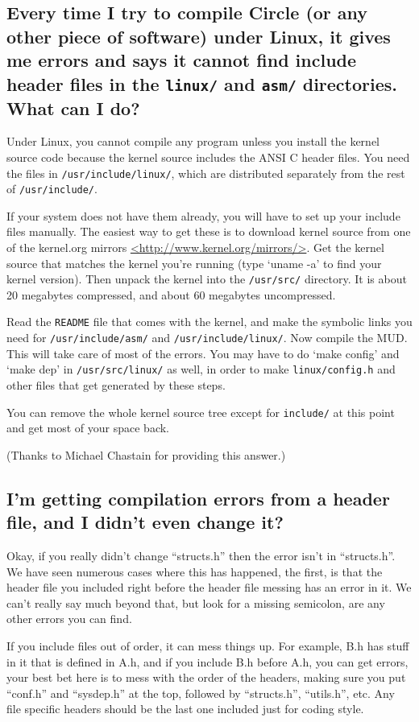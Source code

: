 \documentclass[11pt]{article}
\begin{document}
\subsection{Every time I try to compile Circle (or any other piece of software) under Linux, it gives me errors and says it cannot find include header files in the \texttt{linux/} and \texttt{asm/} directories.  What can I do?}
Under Linux, you cannot compile any program unless you install the kernel source code because the kernel source includes the ANSI C header files.  You need the files in \texttt{/usr/include/linux/}, which are distributed separately from the rest of \texttt{/usr/include/}. 
\par
If your system does not have them already, you will have to set up your include files manually. The easiest way to get these is to download kernel source from one of the kernel.org mirrors
\url{<http://www.kernel.org/mirrors/>}. Get the kernel source that matches the kernel you're running (type `uname -a' to find your kernel version).  Then unpack the kernel into the \texttt{/usr/src/} directory.  It is about 20 megabytes compressed, and about 60 megabytes uncompressed. 
\par
Read the \texttt{README} file that comes with the kernel, and make the symbolic links you need for \texttt{/usr/include/asm/} and \texttt{/usr/include/linux/}. Now compile the MUD.  This will take care of most of the errors.  You may have to do `make config' and `make dep' in \texttt{/usr/src/linux/} as well, in order to make \texttt{linux/config.h} and other files that get generated by these steps. 
\par
You can remove the whole kernel source tree except for \texttt{include/} at this point and get most of your space back. 
\par
(Thanks to Michael Chastain for providing this answer.)

\subsection{I'm getting compilation errors from a header file, and I didn't even change it?}
Okay, if you really didn't change ``structs.h'' then the error isn't in ``structs.h''.  We have seen numerous cases where this has happened, the first, is that the header file you included right before the header file messing has an error in it.  We can't really say much beyond that, but look for a missing semicolon, are any other errors you can find.
\par
If you include files out of order, it can mess things up.  For example, B.h has stuff in it that is defined in A.h, and if you include B.h before A.h, you can get errors, your best bet here is to mess with the order of the headers, making sure you put ``conf.h'' and ``sysdep.h'' at the top, followed by ``structs.h'', ``utils.h'', etc.  Any file specific headers should be the last one included just for coding style.
\end{document}
